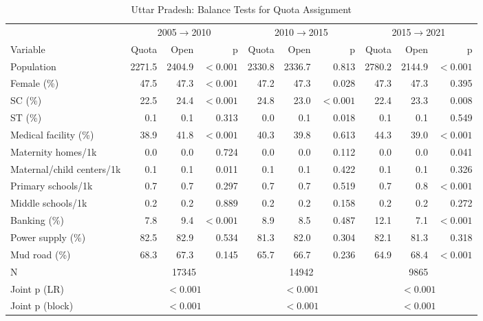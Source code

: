 \begin{table}[htbp]
\caption{Uttar Pradesh: Balance Tests for Quota Assignment}
\label{tab:balance_up_2005_2010}
{\centering\scriptsize
\begin{tabular}{@{}lrrr rrr rrr@{}}
\toprule
& \multicolumn{3}{c}{2005$\rightarrow$2010} & \multicolumn{3}{c}{2010$\rightarrow$2015} & \multicolumn{3}{c}{2015$\rightarrow$2021} \\
\cmidrule(lr){2-4} \cmidrule(lr){5-7} \cmidrule(lr){8-10}
Variable & Quota & Open & p & Quota & Open & p & Quota & Open & p \\
\midrule
Population & 2271.5 & 2404.9 & $<0.001$ & 2330.8 & 2336.7 & 0.813 & 2780.2 & 2144.9 & $<0.001$ \\
Female (\%) & 47.5 & 47.3 & $<0.001$ & 47.2 & 47.3 & 0.028 & 47.3 & 47.3 & 0.395 \\
SC (\%) & 22.5 & 24.4 & $<0.001$ & 24.8 & 23.0 & $<0.001$ & 22.4 & 23.3 & 0.008 \\
ST (\%) & 0.1 & 0.1 & 0.313 & 0.0 & 0.1 & 0.018 & 0.1 & 0.1 & 0.549 \\
Medical facility (\%) & 38.9 & 41.8 & $<0.001$ & 40.3 & 39.8 & 0.613 & 44.3 & 39.0 & $<0.001$ \\
Maternity homes/1k & 0.0 & 0.0 & 0.724 & 0.0 & 0.0 & 0.112 & 0.0 & 0.0 & 0.041 \\
Maternal/child centers/1k & 0.1 & 0.1 & 0.011 & 0.1 & 0.1 & 0.422 & 0.1 & 0.1 & 0.326 \\
Primary schools/1k & 0.7 & 0.7 & 0.297 & 0.7 & 0.7 & 0.519 & 0.7 & 0.8 & $<0.001$ \\
Middle schools/1k & 0.2 & 0.2 & 0.889 & 0.2 & 0.2 & 0.158 & 0.2 & 0.2 & 0.272 \\
Banking (\%) & 7.8 & 9.4 & $<0.001$ & 8.9 & 8.5 & 0.487 & 12.1 & 7.1 & $<0.001$ \\
Power supply (\%) & 82.5 & 82.9 & 0.534 & 81.3 & 82.0 & 0.304 & 82.1 & 81.3 & 0.318 \\
Mud road (\%) & 68.3 & 67.3 & 0.145 & 65.7 & 66.7 & 0.236 & 64.9 & 68.4 & $<0.001$ \\
\midrule
N & \multicolumn{3}{c}{17345} & \multicolumn{3}{c}{14942} & \multicolumn{3}{c}{9865} \\
Joint p (LR) & \multicolumn{3}{c}{$<0.001$} & \multicolumn{3}{c}{$<0.001$} & \multicolumn{3}{c}{$<0.001$} \\
Joint p (block) & \multicolumn{3}{c}{$<0.001$} & \multicolumn{3}{c}{$<0.001$} & \multicolumn{3}{c}{$<0.001$} \\
\bottomrule
\end{tabular}
\par}


\end{table}

